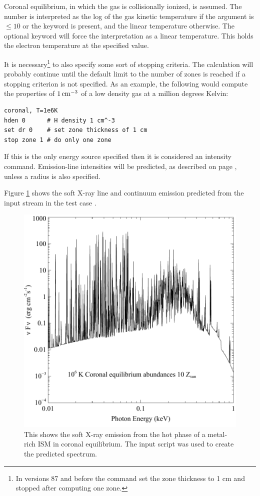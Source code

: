 Coronal equilibrium, in which the gas is collisionally ionized, is
assumed.
The number is interpreted as the log of the
gas kinetic temperature if the
argument is $\le 10$ or the keyword  is present, and the linear temperature otherwise.
The optional keyword
 will force the interpretation as a linear temperature.  This holds
the electron temperature at the specified value.

It is necessary\footnote{In versions 87 and before
the  command set the zone thickness
to 1 cm and stopped after computing one zone.}
to also specify some sort of stopping criteria.
The calculation will probably continue until the default
limit to the number
of zones is reached if a stopping criterion is not specified.
As an example, the following would compute the properties of $1 {\rm\thinspace cm^{-3}}$ of a
low density gas at a million degrees Kelvin:
\begin{verbatim}
coronal, T=1e6K
hden 0      # H density 1 cm^-3
set dr 0    # set zone thickness of 1 cm
stop zone 1 # do only one zone
\end{verbatim}

If this is the only energy source specified then it is considered
an intensity command.
Emission-line intensities will be predicted,
as described on page \pageref{sec:IntensityLuminosityCases},
unless a radius is also specified.

Figure \ref{fig:coronal} shows the soft X-ray line and
continuum emission predicted
from the input stream in the test case .

\begin{figure}
\centering
\includegraphics{coronal}
\caption[X-ray emission spectrum]
{\label{fig:coronal}This shows the soft X-ray emission from
the hot phase of a metal-rich ISM in coronal equilibrium.
The input script  was used
to create the predicted spectrum. }
\end{figure}


